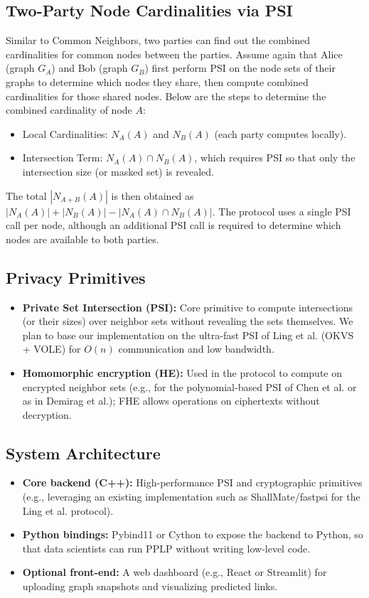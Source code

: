 \documentclass[sigconf]{acmart}
\begin{document}
\subsection{Two-Party Node Cardinalities via PSI}
Similar to Common Neighbors, two parties can find out the combined cardinalities for common nodes between the parties. Assume again that Alice (graph $G_A$) and Bob (graph $G_B$) first perform PSI on the node sets of their graphs to determine which nodes they share, then compute combined cardinalities for those shared nodes. Below are the steps to determine the combined cardinality of node $A$:
\begin{itemize}
  \item Local Cardinalities: $N_A(A)$ and $N_B(A)$ (each party computes locally).
  \item Intersection Term: $N_A(A) \cap N_B(A)$, which requires PSI so that only the intersection size (or masked set) is revealed.
\end{itemize}
The total $|N_{A+B}(A)|$ is then obtained as $|N_A(A)| + |N_B(A)| - |N_A(A) \cap N_B(A)|$. The protocol uses a single PSI call per node, although an additional PSI call is required to determine which nodes are available to both parties.

\subsection{Privacy Primitives}
\begin{itemize}
  \item \textbf{Private Set Intersection (PSI):} Core primitive to compute intersections (or their sizes) over neighbor sets without revealing the sets themselves. We plan to base our implementation on the ultra-fast PSI of Ling et al. (OKVS + VOLE) for $O(n)$ communication and low bandwidth.
  \item \textbf{Homomorphic encryption (HE):} Used in the protocol to compute on encrypted neighbor sets (e.g., for the polynomial-based PSI of Chen et al. or as in Demirag et al.); FHE allows operations on ciphertexts without decryption.
\end{itemize}

\subsection{System Architecture}
\label{sec:midterm-architecture}
\begin{itemize}
  \item \textbf{Core backend (C++):} High-performance PSI and cryptographic primitives (e.g., leveraging an existing implementation such as ShallMate/fastpsi for the Ling et al. protocol).
  \item \textbf{Python bindings:} Pybind11 or Cython to expose the backend to Python, so that data scientists can run PPLP without writing low-level code.
  \item \textbf{Optional front-end:} A web dashboard (e.g., React or Streamlit) for uploading graph snapshots and visualizing predicted links.
\end{itemize}
\end{document}
